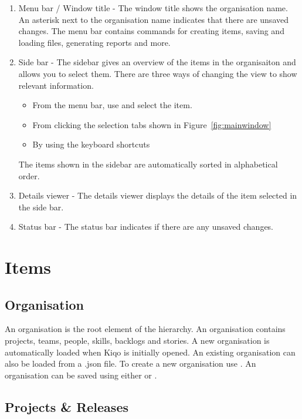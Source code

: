 \documentclass[11pt,fleqn]{book} %
\begin{document}
\begin{enumerate}
\item Menu bar / Window title - The window title shows the organisation name. An asterisk next to the organisation name indicates that there are unsaved changes.
The menu bar contains commands for creating items, saving and loading files, generating reports and more.
\item Side bar - The sidebar gives an overview of the items in the organisaiton and allows you to select them.
There are three ways of changing the view to show relevant information.
    \begin{itemize}
      \item From the menu bar, use  and select the item.
      \item From clicking the selection tabs shown in Figure~\ref{fig:mainwindow}
      \item By using the keyboard shortcuts 
    \end{itemize}
    The items shown in the sidebar are automatically sorted in alphabetical order.
\item Details viewer - The details viewer displays the details of the item selected in the side bar.
\item Status bar - The status bar indicates if there are any unsaved changes.
\end{enumerate}


\chapter{Items}
\section{Organisation}
An organisation is the root element of the hierarchy. An organisation contains projects, teams, people, skills, backlogs and stories.
A new organisation is automatically loaded when Kiqo is initially opened. An existing organisation can also be loaded
from a .json file. To create a new organisation use . An organisation can be saved using
either  or .

\section{Projects \& Releases}
\end{document}
